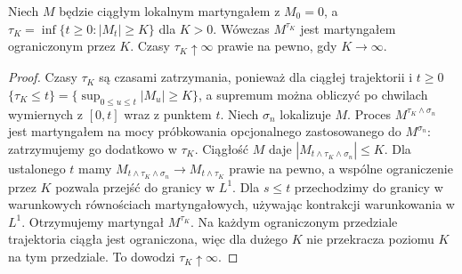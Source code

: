 \begin{twierdzenie}
Niech $M$ będzie ciągłym lokalnym martyngałem z $M_0=0$,
a $\tau_K=\inf\{t\ge0:|M_t|\ge K\}$ dla $K>0$.
Wówczas $M^{\tau_K}$ jest martyngałem ograniczonym
przez $K$. Czasy $\tau_K\uparrow\infty$ prawie na pewno,
gdy $K\to\infty$.
\end{twierdzenie}
\begin{proof}
Czasy $\tau_K$ są czasami zatrzymania, ponieważ
dla ciągłej trajektorii i $t\ge0$
$\{\tau_K\le t\}=\{\sup_{0\le u\le t}|M_u|\ge K\}$,
a supremum można obliczyć po chwilach wymiernych
z $[0,t]$ wraz z punktem $t$.
Niech $\sigma_n$ lokalizuje $M$. Proces
$M^{\tau_K\wedge\sigma_n}$ jest martyngałem na mocy
próbkowania opcjonalnego zastosowanego do
$M^{\sigma_n}$: zatrzymujemy go dodatkowo w $\tau_K$.
Ciągłość $M$ daje $|M_{t\wedge\tau_K\wedge\sigma_n}|\le K$.
Dla ustalonego $t$ mamy
$M_{t\wedge\tau_K\wedge\sigma_n}\to M_{t\wedge\tau_K}$
prawie na pewno, a wspólne ograniczenie przez $K$
pozwala przejść do granicy w $L^1$.
Dla $s\le t$ przechodzimy do granicy w warunkowych
równościach martyngałowych, używając kontrakcji warunkowania
w $L^1$. Otrzymujemy martyngał $M^{\tau_K}$.
Na każdym ograniczonym przedziale trajektoria ciągła jest
ograniczona, więc dla dużego $K$ nie przekracza poziomu
$K$ na tym przedziale. To dowodzi $\tau_K\uparrow\infty$.
\end{proof}

